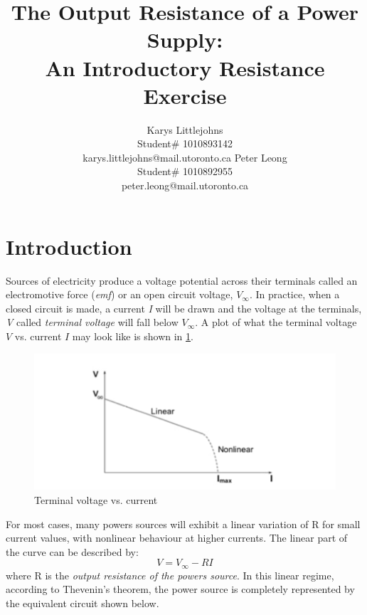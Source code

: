 \documentclass{article} %
\title{The Output Resistance of a Power Supply: \\
An Introductory Resistance Exercise}
\author{Karys Littlejohns\\
Student\# 1010893142 \\
karys.littlejohns@mail.utoronto.ca
\And
Peter Leong \\
Student\# 1010892955 \\
peter.leong@mail.utoronto.ca \\
\AND
}
\begin{document}
\maketitle

\vspace{-6ex}




\section{Introduction}

Sources of electricity produce a voltage potential across their terminals called an electromotive force (\textit{emf}) or an open circuit voltage, $V_{\infty}$.
In practice, when a closed circuit is made, a current \textit{I} will be drawn and the voltage at the terminals, \textit{V} called \textit{terminal voltage} will fall below $V_{\infty}$.
A plot of what the terminal voltage $V$ vs. current $I$ may look like is shown in \ref{fig:terminal_voltage_vs_current}.

\begin{figure}[htbp]            %
  \centering
  \includegraphics[width=0.65\linewidth]{Figs/terminal_voltage_current_linear.jpg}
  \caption{Terminal voltage vs. current}
  \label{fig:terminal_voltage_vs_current}
\end{figure}

For most cases, many powers sources will exhibit a linear variation of R for small current values, with nonlinear behaviour at higher currents.
The linear part of the curve can be described by:
\[
V = V_{\infty} - RI
\]
where R is the \textit{output resistance of the powers source}.
In this linear regime, according to Thevenin's theorem, the power source is completely represented by the equivalent circuit shown below.
\end{document}
